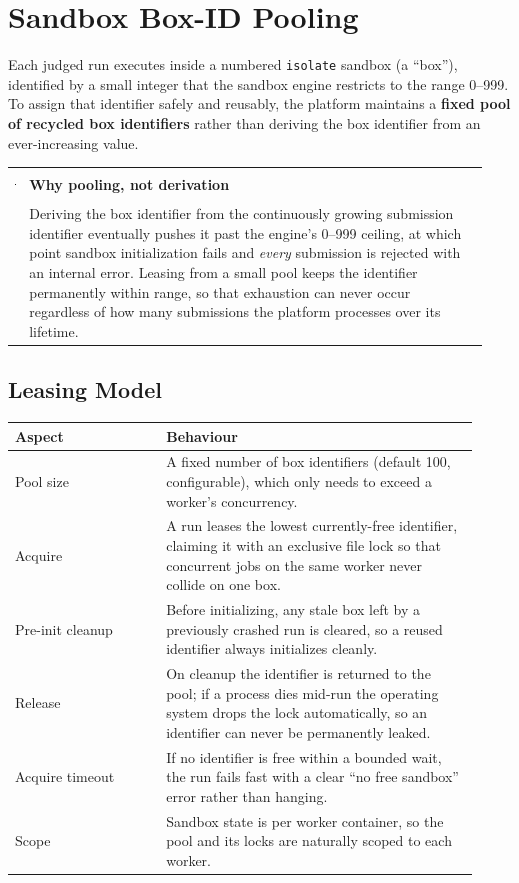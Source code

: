 \documentclass[12pt,a4paper,oneside]{report}
\makeatletter
\newcommand{\code}[1]{\texttt{#1}}
\newenvironment{callout}[1]{\par\vspace{4pt}\noindent
  \begin{tabular}{@{}p{0.014\linewidth}@{\hspace{0.6em}}p{0.93\linewidth}@{}}
  \textcolor{boxframe}{\rule{2pt}{\baselineskip}} & \textbf{\textcolor{tcetblue}{#1}}\\[2pt] & }{\end{tabular}\par\vspace{6pt}}
\makeatother
\begin{document}
\section{Sandbox Box-ID Pooling}
Each judged run executes inside a numbered \code{isolate} sandbox (a ``box''),
identified by a small integer that the sandbox engine restricts to the range
0--999. To assign that identifier safely and reusably, the platform maintains a
\textbf{fixed pool of recycled box identifiers} rather than deriving the box
identifier from an ever-increasing value.

\begin{callout}{Why pooling, not derivation}
Deriving the box identifier from the continuously growing submission identifier
eventually pushes it past the engine's 0--999 ceiling, at which point sandbox
initialization fails and \emph{every} submission is rejected with an internal
error. Leasing from a small pool keeps the identifier permanently within range,
so that exhaustion can never occur regardless of how many submissions the
platform processes over its lifetime.
\end{callout}

\subsection{Leasing Model}
\begin{longtable}{@{}p{0.30\linewidth} p{0.62\linewidth}@{}}
\toprule
\textbf{Aspect} & \textbf{Behaviour}\\
\midrule
\endhead
Pool size & A fixed number of box identifiers (default 100, configurable), which only needs to exceed a worker's concurrency.\\
Acquire & A run leases the lowest currently-free identifier, claiming it with an exclusive file lock so that concurrent jobs on the same worker never collide on one box.\\
Pre-init cleanup & Before initializing, any stale box left by a previously crashed run is cleared, so a reused identifier always initializes cleanly.\\
Release & On cleanup the identifier is returned to the pool; if a process dies mid-run the operating system drops the lock automatically, so an identifier can never be permanently leaked.\\
Acquire timeout & If no identifier is free within a bounded wait, the run fails fast with a clear ``no free sandbox'' error rather than hanging.\\
Scope & Sandbox state is per worker container, so the pool and its locks are naturally scoped to each worker.\\
\bottomrule
\end{longtable}
\end{document}
